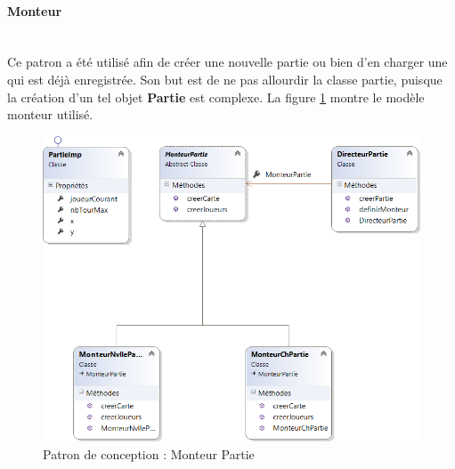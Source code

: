 \documentclass[a4paper,11pt]{article}
\begin{document}
\paragraph{Monteur}\mbox{}\medskip\\
Ce patron a été utilisé afin de créer une nouvelle partie ou bien d'en charger une qui est déjà enregistrée. Son but est de ne pas allourdir la classe partie, puisque la création d'un tel objet \textbf{Partie} est complexe. La figure \ref{pc:mp} montre le modèle monteur utilisé.
\begin{figure}[H]
	\centering
	\includegraphics[width=\textwidth]{fig/monteur_partie}
	\caption{Patron de conception : Monteur Partie}
	\label{pc:mp}
\end{figure}
\end{document}
